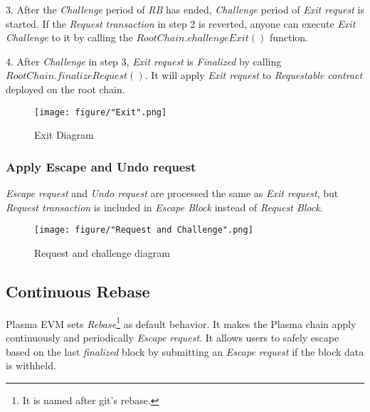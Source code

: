 \documentclass[letterpaper, 11pt]{article}
\begin{document}
\begin{CJK}{UTF8}{mj}
\begin{CJK}{UTF8}{mj}
3. After the \emph{Challenge} period of \emph{RB} has ended, \emph{Challenge} period of \emph{Exit request} is started. If the \emph{Request transaction} in step 2 is reverted, anyone can execute \emph{Exit Challenge} to it by calling the $RootChain.challengeExit()$ function.

4. After \emph{Challenge} in step 3, \emph{Exit request} is \emph{Finalized} by calling $RootChain.finalizeRequest()$. It will apply \emph{Exit request} to \emph{Requestable contract} deployed on the root chain.

\begin{figure}[H]
\centering
\texttt{[image: figure/"Exit".png]}
\caption{Exit Diagram}
\label{fig:exit-diagram}
\end{figure}

\end{CJK}

\subsubsection{Apply Escape and Undo request}
\begin{CJK}{UTF8}{mj}
\emph{Escape request} and \emph{Undo request} are processed the same as \emph{Exit request}, but \emph{Request transaction} is included in \emph{Escape Block} instead of \emph{Request Block}.
\end{CJK}

\end{CJK}

\begin{figure}[!h]
\centering
\texttt{[image: figure/"Request and Challenge".png]}
\caption{Request and challenge diagram}
\label{fig:figure2}
\end{figure}

\subsection{Continuous Rebase} \label{subsec:continuous-rebase}
\begin{CJK}{UTF8}{mj}
Plasma EVM sets \emph{Rebase}\footnote{It is named after git's rebase.} as default behavior. It makes the Plasma chain apply continuously and periodically \emph{Escape request}. It allows users to safely escape based on the last \emph{finalized} block by submitting an \emph{Escape request} if the block data is withheld.
\end{CJK}
\end{document}
